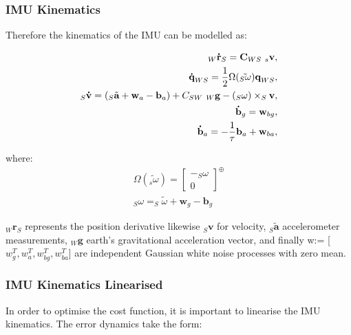 \documentclass[a4paper,11pt,notitlepage]{article}
\begin{document}
\subsubsection{IMU Kinematics}

Therefore the kinematics of the IMU can be modelled as:

\begin{equation}
\begin{aligned}
\label{imu_kin}
_{W} \textbf{\.{r}}_{S} = \textbf{C}_{WS} \textnormal{ } _{s}\textbf{v}, \\
\textbf{\.{q}}_{WS} = \frac{1}{2} \Omega(\tilde{_{S}\textbf{$\omega$}})\textbf{q}_{WS}, \\
_{S}\textbf{\.{v}}= (_{S}\tilde{\textbf{a}} + \textbf{w}_{a} - \textbf{b}_{a}) + C_{SW} \textnormal{ } _{W}\textbf{g} - (_{S}\textbf{$\omega$}) \times _{S}\textbf{v}, \\
\textbf{\.{b}}_{g} = \textbf{w}_{bg}, \\
\textbf{\.{b}}_{a} = -\frac{1}{\tau}\textbf{b}_{a} + \textbf{w}_{ba}, \\
\end{aligned}
\end{equation}

where:
\begin{equation}
\begin{aligned}
 \Omega(\tilde{_{s}\textbf{$\omega$}}) = \begin{bmatrix}
       -_{S}\textbf{$\omega$}  \\[0.3em]
       0
     \end{bmatrix} ^{\oplus} \\
_{S}\textbf{$\omega$} =  _{S}\tilde{\textbf{$\omega$}} + \textbf{w}_{g} - \textbf{b}_{g}
\end{aligned}
\end{equation}

 $_{W} \textbf{\.{r}}_{S}$ represents the position derivative likewise $_{S}\textbf{\.{v}}$ for velocity,  $_{S}\tilde{\textbf{a}}$ accelerometer measurements, $_{W}\textbf{g}$ earth's gravitational acceleration vector, and finally w:= [$w_{g}^{T},w_{a}^{T},w_{bg}^{T},w_{ba}^{T}$] are independent Gaussian white noise processes with zero mean.
 
 \subsubsection{IMU Kinematics Linearised}
 
 In order to optimise the cost function, it is important to linearise the IMU kinematics. The error dynamics take the form:
 
\end{document}
